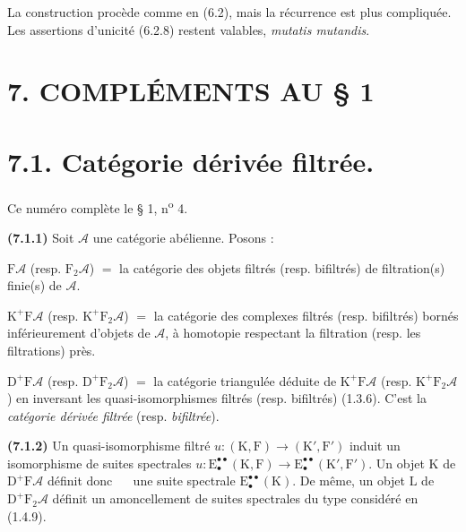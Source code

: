 \documentclass[11pt,leqno]{article}
\newcommand{\Page}[1]{\ifvmode\noindent\else\unskip\ \fi{\footnotesize\textcolor{gray}{[p.\,#1]}}\ \ignorespaces}
\begin{document}
La construction procède comme en (6.2), mais la récurrence est plus compliquée. Les assertions d’unicité (6.2.8) restent valables, \textit{mutatis mutandis}.

\section*{7. COMPLÉMENTS AU § 1}

\section*{7.1. Catégorie dérivée filtrée.}

Ce numéro complète le § 1, n\textsuperscript{o} 4.

\textbf{(7.1.1)} Soit \(\mathscr{A}\) une catégorie abélienne. Posons :

\noindent
\(\mathrm{F}\mathscr{A}\) (resp. \(\mathrm{F}_2\mathscr{A}\)) \(=\) la catégorie des objets filtrés (resp. bifiltrés) de filtration(s) finie(s) de \(\mathscr{A}\).

\noindent
\(\mathrm{K}^{+}\mathrm{F}\mathscr{A}\) (resp. \(\mathrm{K}^{+}\mathrm{F}_2\mathscr{A}\)) \(=\) la catégorie des complexes filtrés (resp. bifiltrés) bornés inférieurement d’objets de \(\mathscr{A}\), à homotopie respectant la filtration (resp. les filtrations) près.

\noindent
\(\mathrm{D}^{+}\mathrm{F}\mathscr{A}\) (resp. \(\mathrm{D}^{+}\mathrm{F}_2\mathscr{A}\)) \(=\) la catégorie triangulée déduite de \(\mathrm{K}^{+}\mathrm{F}\mathscr{A}\) (resp. \(\mathrm{K}^{+}\mathrm{F}_2\mathscr{A}\)) en inversant les quasi-isomorphismes filtrés (resp. bifiltrés) (1.3.6). C’est la \textit{catégorie dérivée filtrée} (resp. \textit{bifiltrée}).

\textbf{(7.1.2)} Un quasi-isomorphisme filtré \(u:(\mathrm{K},\mathrm{F})\to(\mathrm{K}',\mathrm{F}')\) induit un isomorphisme de suites spectrales \(u:\mathrm{E}_{\bullet}^{\bullet\bullet}(\mathrm{K},\mathrm{F})\to\mathrm{E}_{\bullet}^{\bullet\bullet}(\mathrm{K}',\mathrm{F}')\). Un objet \(\mathrm{K}\) de \(\mathrm{D}^{+}\mathrm{F}\mathscr{A}\) définit donc
\Page{24}
une suite spectrale \(\mathrm{E}_{\bullet}^{\bullet\bullet}(\mathrm{K})\). De même, un objet \(\mathrm{L}\) de \(\mathrm{D}^{+}\mathrm{F}_2\mathscr{A}\) définit un amoncellement de suites spectrales du type considéré en (1.4.9).
\end{document}
